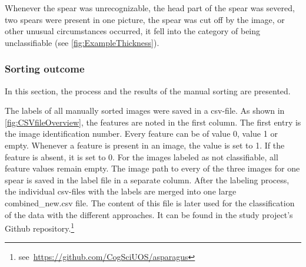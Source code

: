 Whenever the spear was unrecognizable, the head part of the spear was severed, two spears were present in one picture, the spear was cut off by the image, or other unusual circumstances occurred, it fell into the category of being unclassifiable (see \autoref{fig:ExampleThickness}).


\subsubsection{Sorting outcome}
\label{subsec:SortingOutcome}

In this section, the process and the results of the manual sorting are presented.

The labels of all manually sorted images were saved in a csv-file. As shown in \autoref{fig:CSVfileOverview}, the features are noted in the first column. The first entry is the image identification number. Every feature can be of value 0, value 1 or empty. Whenever a feature is present in an image, the value is set to 1. If the feature is absent, it is set to 0. For the images labeled as not classifiable, all feature values remain empty. The image path to every of the three images for one spear is saved in the label file in a separate column. After the labeling process, the individual csv-files with the labels are merged into one large combined\_new.csv file. The content of this file is later used for the classification of the data with the different approaches. It can be found in the study project’s Github repository.\footnote{see~\url{https://github.com/CogSciUOS/asparagus}}

\begin{table}[!hb]
	\centering
	\vspace{10pt}
	\caption[Manual Labeling Feature Representation]{\textbf{Feature Representation in the Data Set} \\ In this table, the representation of each feature in the manually labeled 13319 asparagus samples is reported in \%.}
	\label{tab:FeatureRepresentation}
\end{table}

